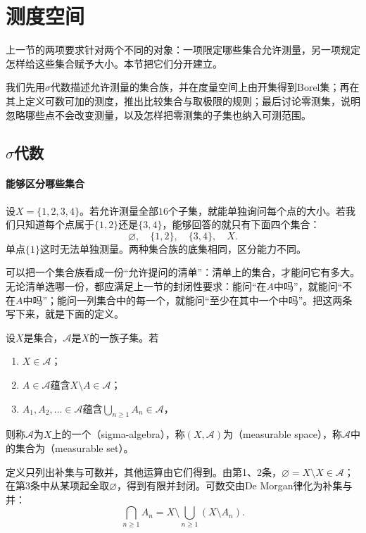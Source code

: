 \section{测度空间}
\label{sec:meas-measure-spaces}

上一节的两项要求针对两个不同的对象：一项限定哪些集合允许测量，另一项规定怎样给这些集合赋予大小。本节把它们分开建立。

我们先用$\sigma$代数描述允许测量的集合族，并在度量空间上由开集得到Borel集；再在其上定义可数可加的测度，推出比较集合与取极限的规则；最后讨论零测集，说明忽略哪些点不会改变测量，以及怎样把零测集的子集也纳入可测范围。

\subsection{$\sigma$代数}
\label{sec:meas-sigma-algebras}

\paragraph{能够区分哪些集合}
设$X=\{1,2,3,4\}$。若允许测量全部$16$个子集，就能单独询问每个点的大小。若我们只知道每个点属于$\{1,2\}$还是$\{3,4\}$，能够回答的就只有下面四个集合：
\[
 \varnothing,\quad\{1,2\},\quad\{3,4\},\quad X.
\]
单点$\{1\}$这时无法单独测量。两种集合族的底集相同，区分能力不同。

可以把一个集合族看成一份“允许提问的清单”：清单上的集合，才能问它有多大。无论清单选哪一份，都应满足上一节的封闭性要求：能问“在$A$中吗”，就能问“不在$A$中吗”；能问一列集合中的每一个，就能问“至少在其中一个中吗”。把这两条写下来，就是下面的定义。

\begin{definition}[$\sigma$代数]
\label{def:meas-sigma-algebra}
设$X$是集合，$\mathcal A$是$X$的一族子集。若
\begin{enumerate}
 \item $X\in\mathcal A$；
 \item $A\in\mathcal A$蕴含$X\setminus A\in\mathcal A$；
 \item $A_1,A_2,\dots\in\mathcal A$蕴含$\bigcup_{n\geq1}A_n\in\mathcal A$，
\end{enumerate}
则称$\mathcal A$为$X$上的一个（sigma-algebra），称$(X,\mathcal A)$为（measurable space），称$\mathcal A$中的集合为（measurable set）。
\end{definition}

定义只列出补集与可数并，其他运算由它们得到。由第1、2条，$\varnothing=X\setminus X\in\mathcal A$；在第3条中从某项起全取$\varnothing$，得到有限并封闭。可数交由De Morgan律化为补集与并：
\[
 \bigcap_{n\geq1}A_n=X\setminus\bigcup_{n\geq1}(X\setminus A_n).
\]

